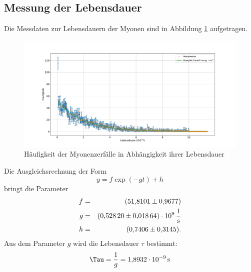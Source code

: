 \subsection{Messung der Lebensdauer}
Die Messdaten zur Lebensdauern der Myonen sind in Abbildung \ref{fig:myonen} aufgetragen.
\begin{figure}[h!]
  \centering
  \includegraphics[width=\textwidth]{figmyonen.pdf}
  \caption{Häufigkeit der Myonenzerfälle in Abhängigkeit ihrer Lebensdauer}
  \label{fig:myonen}
\end{figure}
Die Ausgleichsrechnung der Form
\begin{equation*}
  y = f \exp{(-g t)}+h
\end{equation*}
bringt die Parameter
\begin{align*}
  f  &=&  \SI{51.8101 \pm 0.9677}{}\\
  g  &=&  \SI{0.5282 \pm 0.01864 e9}{\frac{1}{s}}\\
  h  &=&  \SI{0.7406 \pm 0.3145}{}.\\
\end{align*}
Aus dem Parameter $g$ wird die Lebensdauer $\tau$ bestimmt:
\begin{equation*}
  \Tau=\frac{1}{g}=\SI{1.8932e-09}{s}
\end{equation*}
\FloatBarrier
